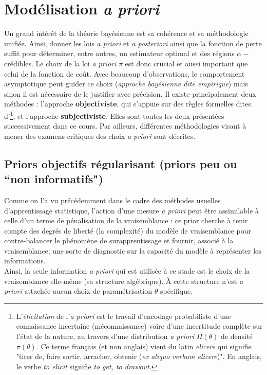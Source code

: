 \section{Modélisation {\it a priori}}\label{modelisation-prior}

Un grand intérêt de la théorie bayésienne est sa  cohérence et sa méthodologie unifiée. Ainsi, donner les lois {\it a priori} et {\it a posteriori} ainsi que la fonction de perte suffit pour déterminer, entre autres, un estimateur optimal et des régions $\alpha-$crédibles. Le choix de la loi {\it a priori}  $\pi$ est donc crucial et aussi important que celui de la fonction de coût. Avec beaucoup d'observations, le comportement asymptotique peut guider ce choix (\textit{approche bayésienne dite empirique}) mais sinon il est nécessaire de le justifier avec précision. Il existe principalement deux méthodes : l'approche {\bf objectiviste}, qui s'appuie sur des règles formelles dites d'\footnote{L'{\it élicitation} de l'{\it a priori} est le travail d'encodage probabiliste d'une connaissance incertaine (méconnaissance) voire d'une incertitude complète sur l'état de la nature, au travers d'une distribution {\it a priori} $\Pi(\theta)$ de densité $\pi(\theta)$. Ce terme fran\c cais (et non anglais) vient du latin \emph{elicere} qui signifie "tirer de, faire sortir, arracher, obtenir ({\it ex aliquo verbum elicere})". En anglais, le verbe \emph{to elicit} signifie \emph{to get, to drawout}.}, et l'approche {\bf subjectiviste}. Elles sont toutes les deux présentées successivement dans ce cours. Par ailleurs, différentes méthodologies visant à mener des examens critiques des choix {\it a priori} sont décrites. 


\subsection{Priors objectifs régularisant (priors peu ou ``non informatifs")}

Comme on l'a vu précédemment dans le cadre des méthodes usuelles d'apprentissage statistique, l'action d'une mesure {\it a priori} peut être assimilable à celle d'un terme de pénalisation de la vraisemblance : ce prior cherche à tenir compte des degrés de liberté (la complexité) du modèle de vraisemblance pour contre-balancer le phénomène de surapprentissage et fournir, associé à la vraisemblance, une sorte de diagnostic sur la capacité du modèle à représenter les informations. \\

Ainsi, la seule information {\it a priori} qui est utilisée à ce stade est le choix de la vraisemblance elle-même (sa structure algébrique). \`A cette structure n'est {\it a priori} attachée aucun choix de paramétrisation $\theta$ spécifique. \\

